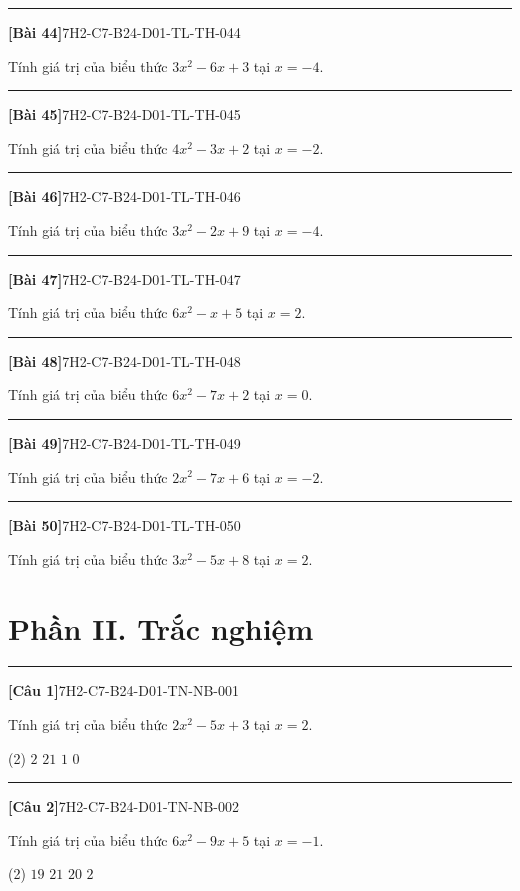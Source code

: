 \documentclass[12pt,a4paper]{article}
\newif\ifloigiai
\newenvironment{cauhoi}[2]{%
  \par\medskip\noindent\rule{\textwidth}{0.4pt}\par\nopagebreak
  \noindent\textbf{[#1]}\hfill{\scriptsize\ttfamily #2}\par\nopagebreak\smallskip}{\par}
\newcommand{\loigiai}[1]{\ifloigiai\par\smallskip\noindent\textit{Lời giải.} #1\par\fi}
\newcommand{\dapan}[1]{\ifloigiai\par\smallskip\noindent\textit{Đáp án:} \textbf{#1}\par\fi}
\begin{document}
\begin{cauhoi}{Bài 44}{7H2-C7-B24-D01-TL-TH-044}
Tính giá trị của biểu thức $3x^{2}-6x+3$ tại $x=-4$.
\loigiai{Thay $x=-4$: $3\cdot(-4)^{2}-6\cdot(-4)+3=75$.}
\end{cauhoi}
\begin{cauhoi}{Bài 45}{7H2-C7-B24-D01-TL-TH-045}
Tính giá trị của biểu thức $4x^{2}-3x+2$ tại $x=-2$.
\loigiai{Thay $x=-2$: $4\cdot(-2)^{2}-3\cdot(-2)+2=24$.}
\end{cauhoi}
\begin{cauhoi}{Bài 46}{7H2-C7-B24-D01-TL-TH-046}
Tính giá trị của biểu thức $3x^{2}-2x+9$ tại $x=-4$.
\loigiai{Thay $x=-4$: $3\cdot(-4)^{2}-2\cdot(-4)+9=65$.}
\end{cauhoi}
\begin{cauhoi}{Bài 47}{7H2-C7-B24-D01-TL-TH-047}
Tính giá trị của biểu thức $6x^{2}-x+5$ tại $x=2$.
\loigiai{Thay $x=2$: $6\cdot(2)^{2}-1\cdot(2)+5=27$.}
\end{cauhoi}
\begin{cauhoi}{Bài 48}{7H2-C7-B24-D01-TL-TH-048}
Tính giá trị của biểu thức $6x^{2}-7x+2$ tại $x=0$.
\loigiai{Thay $x=0$: $6\cdot(0)^{2}-7\cdot(0)+2=2$.}
\end{cauhoi}
\begin{cauhoi}{Bài 49}{7H2-C7-B24-D01-TL-TH-049}
Tính giá trị của biểu thức $2x^{2}-7x+6$ tại $x=-2$.
\loigiai{Thay $x=-2$: $2\cdot(-2)^{2}-7\cdot(-2)+6=28$.}
\end{cauhoi}
\begin{cauhoi}{Bài 50}{7H2-C7-B24-D01-TL-TH-050}
Tính giá trị của biểu thức $3x^{2}-5x+8$ tại $x=2$.
\loigiai{Thay $x=2$: $3\cdot(2)^{2}-5\cdot(2)+8=10$.}
\end{cauhoi}
\clearpage\section*{Phần II. Trắc nghiệm}
\begin{cauhoi}{Câu 1}{7H2-C7-B24-D01-TN-NB-001}
Tính giá trị của biểu thức $2x^{2}-5x+3$ tại $x=2$.
\begin{tasks}(2)
\task $2$
\task $21$
\task $1$
\task $0$
\end{tasks}
\dapan{C}
\end{cauhoi}
\begin{cauhoi}{Câu 2}{7H2-C7-B24-D01-TN-NB-002}
Tính giá trị của biểu thức $6x^{2}-9x+5$ tại $x=-1$.
\begin{tasks}(2)
\task $19$
\task $21$
\task $20$
\task $2$
\end{tasks}
\dapan{C}
\end{cauhoi}
\end{document}
